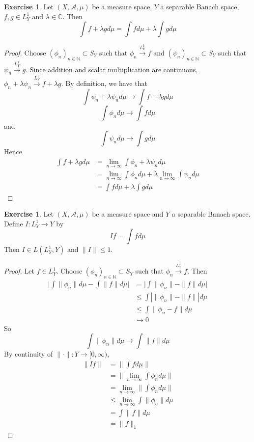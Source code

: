 \documentclass{book}
\theoremstyle{definition}
\newtheorem{ex}[definition]{Exercise}
\newcommand{\lam}{\lambda}
\newcommand{\C}{\mathbb{C}}
\newcommand{\N}{\mathbb{N}}
\newcommand{\MA}{\mathcal{A}}
\newcommand{\lex}[1]{\label{ex:#1}}
\DeclareMathOperator*{\0}{\mbf{0}}
\DeclareMathOperator*{\1}{\mbf{1}}
\newcommand{\limn}{\lim \limits_{n \rightarrow \infty}}
\newcommand{\conv}[1]{\xrightarrow{#1}}
\newcommand{\Rg}{[0,\infty)}
\begin{document}
	\begin{ex} \lex{00000} 
	Let $(X, \MA, \mu)$ be a measure space, $Y$ a separable Banach space, $f,g \in L^1_Y$ and $\lam \in \C$. Then $$\int f+\lam g d\mu = \int f d \mu + \lam \int g d\mu$$
	\end{ex}
	
	\begin{proof}
	Choose $(\phi_n)_{n \in \N} \subset S_Y$ such that $\phi_n \conv{L^1_Y} f$ and $(\psi_n)_{n \in \N} \subset S_Y$ such that $\psi_n \conv{L^1_Y} g$. Since addition and  scalar multiplication are continuous, $\phi_n + \lam \psi_n \conv{L^1_Y} f+\lam g$. By definition, we have that $$\int \phi_n + \lam \psi_n  d\mu \rightarrow \int f+\lam g d\mu $$ $$\int \phi_n d\mu \rightarrow \int f d\mu$$ and $$ \int \psi_n d\mu \rightarrow \int g d\mu$$ 
	Hence 
	\begin{align*}
	\int f+ \lam g d\mu 
	&= \limn \int \phi_n + \lam \psi_n  d\mu \\
	&= \limn \int \phi_n d\mu + \lam \limn \int \psi_n  d\mu \\
	&= \int f d\mu + \lam \int g d\mu
	\end{align*}
	\end{proof}
	
	\begin{ex} \lex{00000} 
	Let $(X, \MA, \mu)$ be a measure space and $Y$ a separable Banach space. Define $I: L^1_Y \rightarrow Y$ by $$If = \int f d\mu$$
	Then $I \in L(L^1_Y, Y)$ and $\|I\| \leq 1$.
	\end{ex}
	
	\begin{proof}
	Let $f \in L^1_Y$. Choose $(\phi_n)_{n \in \N} \subset S_Y$ such that $\phi_n \conv{L^1_Y} f$. Then 
	\begin{align*}
	\bigg | \int \| \phi_n \| d \mu - \int \| f\| d\mu \bigg |
	&= \bigg | \int \| \phi_n \| - \| f\| d\mu \bigg | \\
	& \leq \int |\| \phi_n \| - \| f\| | d\mu \\
	& \leq  \int \| \phi_n - f\| d\mu \\
	& \rightarrow 0
	\end{align*}
	So  $$ \int \| \phi_n \| d \mu \rightarrow  \int \| f \| d \mu$$
	By continuity of $\|\cdot\|:Y \rightarrow \Rg$,
	\begin{align*}
	\|I f\|
	& = \bigg \| \int f d\mu \bigg \| \\
	&= \bigg \| \limn \int \phi_n d\mu \bigg \| \\
	&= \limn  \bigg \| \int \phi_n d\mu \bigg \| \\
	& \leq \limn \int \| \phi_n \| d \mu \\
	&= \int \| f \| d\mu  \\
	&= \|f\|_1
	\end{align*}
	\end{proof}
\end{document}
